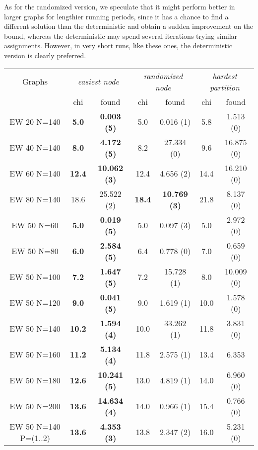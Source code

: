 As for the randomized version, we speculate that it might perform better in larger graphs for lengthier running periods, since it has a chance to find a different solution than the deterministic and obtain a sudden improvement on the bound, whereas the deterministic may spend several iterations trying similar assignments. However, in very short runs, like these ones, the deterministic version is clearly preferred.  

\begin{table}
\centering

\begin{tabular}{|c|cc|cc|cc|}
\hline
\multicolumn{1}{|c|}{Graphs} & \multicolumn{2}{|c|}{\textit{easiest node}} & \multicolumn{2}{|c|}{\textit{randomized node}} & \multicolumn{2}{|c|}{\textit{hardest partition}}
\\
 & chi & found & chi & found & chi & found
\\
\hline
EW 20 N=140 & \textbf{5.0} & \textbf{0.003 (5)} & 5.0 & 0.016 (1) & 5.8 & 1.513 (0)
\\
EW 40 N=140 & \textbf{8.0} & \textbf{4.172 (5)} & 8.2 & 27.334 (0) & 9.6 & 16.875 (0)
\\
EW 60 N=140 & \textbf{12.4} & \textbf{10.062 (3)} & 12.4 & 4.656 (2) & 14.4 & 16.210 (0)
\\
EW 80 N=140 & 18.6 & 25.522 (2) & \textbf{18.4} & \textbf{10.769 (3)} & 21.8 & 8.137 (0)
\\
\hline
EW 50 N=60 & \textbf{5.0} & \textbf{0.019 (5)} & 5.0 & 0.097 (3) & 5.0 & 2.972 (0)
\\
EW 50 N=80 & \textbf{6.0} & \textbf{2.584 (5)} & 6.4 & 0.778 (0) & 7.0 & 0.659 (0)
\\
EW 50 N=100 & \textbf{7.2} & \textbf{1.647 (5)} & 7.2 & 15.728 (1) & 8.0 & 10.009 (0)
\\
EW 50 N=120 & \textbf{9.0} & \textbf{0.041 (5)} & 9.0 & 1.619 (1) & 10.0 & 1.578 (0)
\\
EW 50 N=140 & \textbf{10.2} & \textbf{1.594 (4)} & 10.0 & 33.262 (1) & 11.8 & 3.831 (0)
\\
EW 50 N=160 & \textbf{11.2} & \textbf{5.134 (4)} & 11.8 & 2.575 (1) & 13.4 & 6.353
\\
EW 50 N=180 & \textbf{12.6} & \textbf{10.241 (5)} & 13.0 & 4.819 (1) & 14.0 & 6.960 (0)
\\
EW 50 N=200 & \textbf{13.6} & \textbf{14.634 (4)} & 14.0 & 0.966 (1) & 15.4 & 0.766 (0)
\\
\hline
EW 50 N=140 P=(1..2) & \textbf{13.6} & \textbf{4.353 (3)} & 13.8  & 2.347 (2) & 16.0 & 5.231 (0)

\end{tabular}
\end{table}
